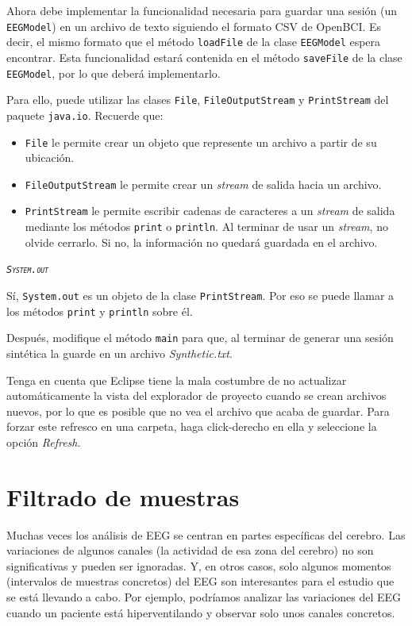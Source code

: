 \documentclass[10pt,a4paper,spanish]{article}
\newcommand{\sombreado}[2]{
  \begin{shaded}
    \begin{center} \emph{\textsc{#1}} \end{center}
    \noindent #2\\
  \end{shaded}
}
\newcommand{\code}[1]{\texttt{#1}}
\begin{document}
Ahora debe implementar la funcionalidad necesaria para guardar una sesión (un \code{EEGModel}) en un archivo de texto siguiendo el formato CSV de OpenBCI. Es decir, el mismo formato que el método \code{loadFile} de la clase \code{EEGModel} espera encontrar. Esta funcionalidad estará contenida en el método \code{saveFile} de la clase \code{EEGModel}, por lo que deberá implementarlo.

Para ello, puede utilizar las clases \code{File}, \code{FileOutputStream} y \code{PrintStream} del paquete \code{java.io}. Recuerde que:

\begin{itemize}
    \item \code{File} le permite crear un objeto que represente un archivo a partir de su ubicación. 
    \item \code{FileOutputStream} le permite crear un \textit{stream} de salida hacia un archivo.
    \item \code{PrintStream} le permite escribir cadenas de caracteres a un \textit{stream} de salida mediante los métodos \code{print} o \code{println}. Al terminar de usar un \textit{stream}, no olvide cerrarlo. Si no, la información no quedará guardada en el archivo.
\end{itemize}

\sombreado{\code{System.out}}{Sí, \code{System.out} es un objeto de la clase \code{PrintStream}. Por eso se puede llamar a los métodos \code{print} y \code{println} sobre él.}

Después, modifique el método \code{main} para que, al terminar de generar una sesión sintética la guarde en un archivo \textit{Synthetic.txt}.

Tenga en cuenta que Eclipse tiene la mala costumbre de no actualizar automáticamente la vista del explorador de proyecto cuando se crean archivos nuevos, por lo que es posible que no vea el archivo que acaba de guardar. Para forzar este refresco en una carpeta, haga click-derecho en ella y seleccione la opción \textit{Refresh}.

\section{Filtrado de muestras}

Muchas veces los análisis de EEG se centran en partes específicas del cerebro. Las variaciones de algunos canales (la actividad de esa zona del cerebro) no son significativas y pueden ser ignoradas. Y, en otros casos, solo algunos momentos (intervalos de muestras concretos) del EEG son interesantes para el estudio que se está llevando a cabo. Por ejemplo, podríamos analizar las variaciones del EEG cuando un paciente está hiperventilando y observar solo unos canales concretos.
\end{document}
